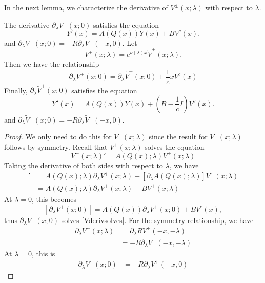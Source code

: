 \documentclass[thesis.tex]{subfiles}
\begin{document}
In the next lemma, we characterize the derivative of $V^\pm(x; \lambda)$ with respect to $\lambda$.

\begin{lemma}\label{lemma:Vpmderiv}
The derivative $\partial_\lambda V^+(x; 0)$ satisfies the equation
\begin{equation}\label{Vderivsolves}
Y'(x) = A(Q(x)) Y(x) + B V^c(x).
\end{equation}
and $\partial_\lambda V^-(x; 0) = -R \partial_\lambda V^+(-x, 0)$. Let 
\begin{equation}\label{deftildeV}
V^+(x; \lambda) = e^{\nu(\lambda)x}\tilde{V}^+(x; \lambda).
\end{equation}
Then we have the relationship
\begin{equation}\label{VtildeVderiv}
\partial_\lambda V^+(x; 0)
= \partial_\lambda \tilde{V}^+(x; 0) + \frac{1}{c} x V^c(x) 
\end{equation}
Finally, $\partial_\lambda \tilde{V}^+(x; 0)$ satisfies the equation
\begin{equation}\label{tildeVderivsolves}
Y'(x) = A(Q(x)) Y(x) + \left( B - \frac{1}{c}I \right) V^c(x).
\end{equation}
and $\partial_\lambda \tilde{V}^-(x; 0) = -R \partial_\lambda \tilde{V}^+(-x, 0)$.

\begin{proof}
We only need to do this for $V^+(x; \lambda)$ since the result for $V^-(x; \lambda)$ follows by symmetry. Recall that $V^+(x; \lambda)$ solves the equation
\begin{equation}\label{Vplussolves1}
V^+(x; \lambda)' = A(Q(x); \lambda) V^+(x; \lambda)
\end{equation}
Taking the derivative of both sides with respect to $\lambda$, we have
\begin{align*}
[\partial_\lambda V^+(x; \lambda)]' 
&= A(Q(x); \lambda) \partial_\lambda V^+(x; \lambda) + [\partial_\lambda A(Q(x); \lambda)] V^+(x; \lambda) \\
&= A(Q(x); \lambda) \partial_\lambda V^+(x; \lambda) + B V^+(x; \lambda)
\end{align*}
At $\lambda = 0$, this becomes
\[
[\partial_\lambda V^+(x; 0)] = A(Q(x)) \partial_\lambda V^+(x; 0) + B V^c(x),
\]
thus $\partial_\lambda V^+(x; 0)$ solves \cref{Vderivsolves}. For the symmetry relationship, we have
\begin{align*}
\partial_\lambda V^-(x; \lambda) &= \partial_\lambda R V^+(-x, -\lambda) \\
&= -R \partial_\lambda V^+(-x, -\lambda)
\end{align*}
At $\lambda = 0$, this is
\begin{align*}
\partial_\lambda V^-(x; 0) 
&= -R \partial_\lambda V^+(-x, 0)
\end{align*}


\end{proof}
\end{lemma}
\end{document}
